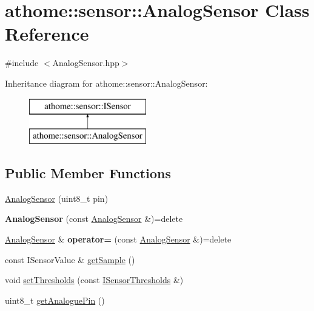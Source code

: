 \hypertarget{classathome_1_1sensor_1_1_analog_sensor}{}\section{athome\+:\+:sensor\+:\+:Analog\+Sensor Class Reference}
\label{classathome_1_1sensor_1_1_analog_sensor}


{\ttfamily \#include $<$Analog\+Sensor.\+hpp$>$}

Inheritance diagram for athome\+:\+:sensor\+:\+:Analog\+Sensor\+:\begin{figure}[H]
\begin{center}
\leavevmode
\includegraphics[height=2.000000cm]{classathome_1_1sensor_1_1_analog_sensor}
\end{center}
\end{figure}
\subsection*{Public Member Functions}
\begin{DoxyCompactItemize}
\item 
\mbox{\hyperlink{classathome_1_1sensor_1_1_analog_sensor_acd973b3cf9be02ca318eea594e8732d3}{Analog\+Sensor}} (uint8\+\_\+t pin)
\item 
\mbox{\label{classathome_1_1sensor_1_1_analog_sensor_a11abebcdb62ccd8fb7f10e4d1cc91516}} 
{\bfseries Analog\+Sensor} (const \mbox{\hyperlink{classathome_1_1sensor_1_1_analog_sensor}{Analog\+Sensor}} \&)=delete
\item 
\mbox{\label{classathome_1_1sensor_1_1_analog_sensor_a3e2cb67bd8eb58798d28eaf152f33b1a}} 
\mbox{\hyperlink{classathome_1_1sensor_1_1_analog_sensor}{Analog\+Sensor}} \& {\bfseries operator=} (const \mbox{\hyperlink{classathome_1_1sensor_1_1_analog_sensor}{Analog\+Sensor}} \&)=delete
\item 
const I\+Sensor\+Value \& \mbox{\hyperlink{classathome_1_1sensor_1_1_analog_sensor_a7ad00f985a9d1abeb64f973b5d16558c}{get\+Sample}} ()
\item 
void \mbox{\hyperlink{classathome_1_1sensor_1_1_analog_sensor_addcdb79aa03b7b6e386bc9c59faced10}{set\+Thresholds}} (const \mbox{\hyperlink{structathome_1_1sensor_1_1_i_sensor_1_1_i_sensor_thresholds}{I\+Sensor\+Thresholds}} \&)
\item 
uint8\+\_\+t \mbox{\hyperlink{classathome_1_1sensor_1_1_analog_sensor_ac4eab6ad6117e8e6689f9e1d9fb05015}{get\+Analogue\+Pin}} ()
\end{DoxyCompactItemize}
